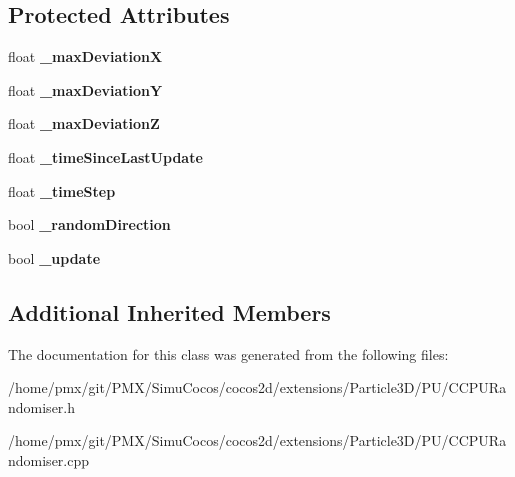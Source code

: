 \subsection*{Protected Attributes}
\begin{DoxyCompactItemize}
\item 
\mbox{\label{classPURandomiser_a5939007234794d4851189b4c8517e6e5}} 
float {\bfseries \+\_\+max\+DeviationX}
\item 
\mbox{\label{classPURandomiser_a03a336afa7c5be498976aeabbd900b95}} 
float {\bfseries \+\_\+max\+DeviationY}
\item 
\mbox{\label{classPURandomiser_a49bd1a8c02d2aa4a90e61cf031c5d934}} 
float {\bfseries \+\_\+max\+DeviationZ}
\item 
\mbox{\label{classPURandomiser_a601708d9f4f0ec6a974f46e97782aad3}} 
float {\bfseries \+\_\+time\+Since\+Last\+Update}
\item 
\mbox{\label{classPURandomiser_a874257c3aac73ef3e587a9e05f11a85a}} 
float {\bfseries \+\_\+time\+Step}
\item 
\mbox{\label{classPURandomiser_a823310fdc0c28ee2553d2687404ea2d2}} 
bool {\bfseries \+\_\+random\+Direction}
\item 
\mbox{\label{classPURandomiser_ab60fcabb7b207719cca6d1866f11548c}} 
bool {\bfseries \+\_\+update}
\end{DoxyCompactItemize}
\subsection*{Additional Inherited Members}


The documentation for this class was generated from the following files\+:\begin{DoxyCompactItemize}
\item 
/home/pmx/git/\+P\+M\+X/\+Simu\+Cocos/cocos2d/extensions/\+Particle3\+D/\+P\+U/C\+C\+P\+U\+Randomiser.\+h\item 
/home/pmx/git/\+P\+M\+X/\+Simu\+Cocos/cocos2d/extensions/\+Particle3\+D/\+P\+U/C\+C\+P\+U\+Randomiser.\+cpp\end{DoxyCompactItemize}
